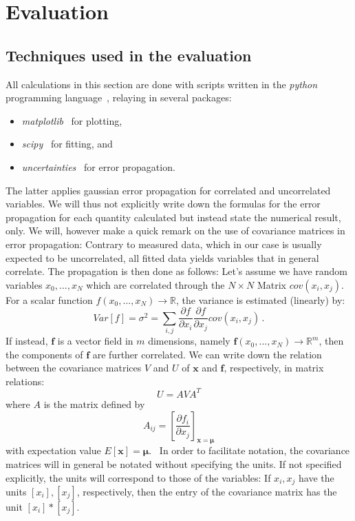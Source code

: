 \newcommand{\figdir}{analysis/figures/}

\section{Evaluation}
\subsection{Techniques used in the evaluation}
All calculations in this section are done with scripts written in 
the \textit{python} programming language~\cite{python}, relaying in several 
packages:
\begin{itemize}
    \item
        \textit{matplotlib}~\cite{Hunter2007} for plotting,
    \item
        \textit{scipy}~\cite{scipy} for fitting, and 
    \item
        \textit{uncertainties}~\cite{uc} for error propagation.
\end{itemize}
The latter applies gaussian error propagation for correlated and uncorrelated variables. 
We will thus not explicitly write down the formulas for the error propagation 
for each quantity calculated but instead state the numerical result, only. 
We will, however make a quick remark on the use of covariance matrices in 
error propagation: Contrary to measured data, which in our case is usually 
expected to be uncorrelated, all fitted data yields variables that in general correlate. 
The propagation is then done as follows:
Let's assume we have random
variables $x_0,...,x_N$ which are correlated through the $N\times N$ Matrix $cov(x_i,x_j)$.
For a scalar function $f(x_0,...,x_N) \rightarrow \mathbb{R}$, the variance is estimated (linearly) by:
\begin{equation}
Var[f] = \sigma^2 = \sum_{i,j} \frac{\partial f}{\partial x_i} \frac{\partial f}{\partial x_j} cov(x_i,x_j) \,.
\end{equation} 
If instead, $\mathbf{f}$ is a vector field in $m$ dimensions, namely 
$\mathbf{f}(x_0,...,x_N) \rightarrow \mathbb{R}^m$, then the components of $\mathbf{f}$ 
are further correlated. We can write down the relation between the covariance matrices $V$ and $U$ of 
$\mathbf{x}$ and $\mathbf{f}$, respectively, in matrix relations:
\begin{equation}
    U = A V A^T
\end{equation}
where $A$ is the matrix defined by 
\begin{equation}
    A_{ij} = \left[ \frac{\partial f_i}{\partial x_j}\right]_{\mathbf{x} = \mathbf{\mu}}
\end{equation}
with expectation value $E[\mathbf{x}] = \mathbf{\mu}$.~\cite{cowan1998statistical}
In order to facilitate notation, the covariance matrices will in general be notated without 
specifying the units. If not specified explicitly, the units will correspond to those of the
variables: If $x_i, x_j$ have the units $[x_i], [x_j]$, respectively, 
then the entry of the covariance matrix has the unit $[x_i] * [x_j]$. 

